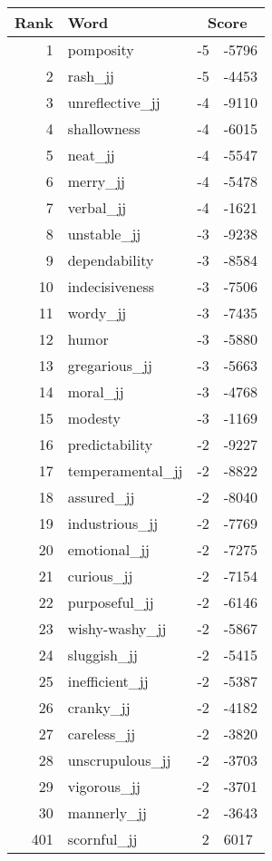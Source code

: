 \begin{longtable}[!htbp]{| rlr@{.}l |}
    \hline
    \textbf{Rank} & \textbf{Word} & \multicolumn{2}{c|}{\textbf{Score}} \\
    \hline
    \endhead
    1 & pomposity & -5 & -5796 \\
    2 & rash\_jj & -5 & -4453 \\
    3 & unreflective\_jj & -4 & -9110 \\
    4 & shallowness & -4 & -6015 \\
    5 & neat\_jj & -4 & -5547 \\
    6 & merry\_jj & -4 & -5478 \\
    7 & verbal\_jj & -4 & -1621 \\
    8 & unstable\_jj & -3 & -9238 \\
    9 & dependability & -3 & -8584 \\
    10 & indecisiveness & -3 & -7506 \\
    11 & wordy\_jj & -3 & -7435 \\
    12 & humor & -3 & -5880 \\
    13 & gregarious\_jj & -3 & -5663 \\
    14 & moral\_jj & -3 & -4768 \\
    15 & modesty & -3 & -1169 \\
    16 & predictability & -2 & -9227 \\
    17 & temperamental\_jj & -2 & -8822 \\
    18 & assured\_jj & -2 & -8040 \\
    19 & industrious\_jj & -2 & -7769 \\
    20 & emotional\_jj & -2 & -7275 \\
    21 & curious\_jj & -2 & -7154 \\
    22 & purposeful\_jj & -2 & -6146 \\
    23 & wishy-washy\_jj & -2 & -5867 \\
    24 & sluggish\_jj & -2 & -5415 \\
    25 & inefficient\_jj & -2 & -5387 \\
    26 & cranky\_jj & -2 & -4182 \\
    27 & careless\_jj & -2 & -3820 \\
    28 & unscrupulous\_jj & -2 & -3703 \\
    29 & vigorous\_jj & -2 & -3701 \\
    30 & mannerly\_jj & -2 & -3643 \\
    401 & scornful\_jj & 2 & 6017 \\

\end{longtable}
